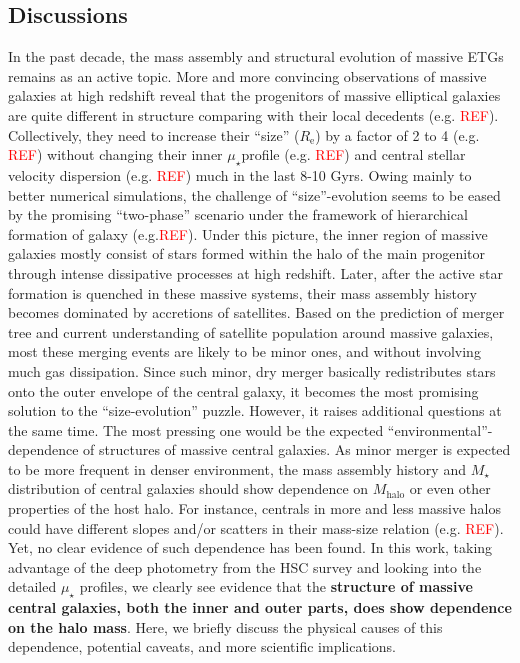 \documentclass{emulateapj}
\def\mstar{{$M_{\star}$}}
\def\mhalo{{$M_{\mathrm{halo}}$}}
\def\mden{{$\mu_{\star}$}}
\newcommand{\addref}{{\textcolor{red}{REF}}}
\begin{document}
\begin{CJK*}{UTF8}{gbsn}
\section{Discussions}
    \label{sec:discussion}
    
    In the past decade, the mass assembly and structural evolution of massive ETGs 
    remains as an active topic.  
    More and more convincing observations of massive galaxies at high redshift reveal that
    the progenitors of massive elliptical galaxies are quite different in structure
    comparing with their local decedents (e.g. \addref{}).  
    Collectively, they need to increase their ``size'' ($R_{\mathrm{e}}$) by a factor of 
    2 to 4 (e.g. \addref{}) without changing their inner \mden profile (e.g. \addref{})
    and central stellar velocity dispersion (e.g. \addref{}) much in the last 8-10 Gyrs.  
    Owing mainly to better numerical simulations, the challenge of ``size''-evolution 
    seems to be eased by the promising ``two-phase'' scenario under the framework of 
    hierarchical formation of galaxy (e.g.\addref{}). 
    Under this picture, the inner region of massive galaxies mostly consist of stars 
    formed within the halo of the main progenitor through intense dissipative processes 
    at high redshift.  
    Later, after the active star formation is quenched in these massive systems, their 
    mass assembly history becomes dominated by accretions of satellites.  
    Based on the prediction of merger tree and current understanding of satellite 
    population around massive galaxies, most these merging events are likely to be 
    minor ones, and without involving much gas dissipation.  
    Since such minor, dry merger basically redistributes stars onto the outer envelope 
    of the central galaxy, it becomes the most promising solution to the ``size-evolution''
    puzzle.  
    However, it raises additional questions at the same time. 
    The most pressing one would be the expected ``environmental''-dependence of structures 
    of massive central galaxies. 
    As minor merger is expected to be more frequent in denser environment, the mass assembly 
    history and \mstar{} distribution of central galaxies should show dependence on \mhalo{}
    or even other properties of the host halo.  
    For instance, centrals in more and less massive halos could have different 
    slopes and/or scatters in their mass-size relation (e.g. \addref{}).  
    Yet, no clear evidence of such dependence has been found. 
    In this work, taking advantage of the deep photometry from the HSC survey and looking 
    into the detailed \mden{} profiles, we clearly see evidence that the \textbf{structure
    of massive central galaxies, both the inner and outer parts, does show dependence on 
    the halo mass}. 
    Here, we briefly discuss the physical causes of this dependence, potential caveats, 
    and more scientific implications.  
    

\end{CJK*}
\end{document}
